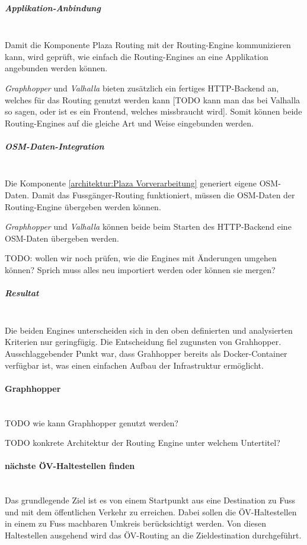 \subparagraph{Applikation-Anbindung}~\\
\label{architektur:Applikation-Anbindung}
Damit die Komponente Plaza Routing mit der Routing-Engine kommunizieren kann, wird geprüft, wie einfach die Routing-Engines an eine Applikation angebunden werden können. 

\emph{Graphhopper} und \emph{Valhalla} bieten zusätzlich ein fertiges HTTP-Backend an, welches für das Routing genutzt werden kann [TODO kann man das bei Valhalla so sagen, oder ist es ein Frontend, welches missbraucht wird]. Somit können beide Routing-Engines auf die gleiche Art und Weise eingebunden werden.

\subparagraph{OSM-Daten-Integration}~\\
\label{architektur:OSM-Daten-Integration}
Die Komponente \ref{architektur:Plaza Vorverarbeitung} generiert eigene \ac{OSM}-Daten. Damit das Fussgänger-Routing funktioniert, müssen die \ac{OSM}-Daten der Routing-Engine übergeben werden können. 

\emph{Graphhopper} und \emph{Valhalla} können beide beim Starten des HTTP-Backend eine {OSM}-Daten übergeben werden.

TODO: wollen wir noch prüfen, wie die Engines mit Änderungen umgehen können? Sprich muss alles neu importiert werden oder können sie mergen?

\subparagraph{Resultat}~\\
\label{architektur:Resulat}
Die beiden Engines unterscheiden sich in den oben definierten und analysierten Kriterien nur geringfügig. Die Entscheidung fiel zugunsten von Grahhopper. Ausschlaggebender Punkt war, dass Grahhopper bereits als Docker-Container verfügbar ist, was einen einfachen Aufbau der Infrastruktur ermöglicht.

\paragraph{Graphhopper}~\\
\label{architektur:Graphhopper}
TODO wie kann Graphhopper genutzt werden?


TODO konkrete Architektur der Routing Engine unter welchem Untertitel?


\paragraph{nächste ÖV-Haltestellen finden}~\\
\label{architektur:nächste ÖV-Haltestellen finden}
Das grundlegende Ziel ist es von einem Startpunkt aus eine Destination zu Fuss und mit dem öffentlichen Verkehr zu erreichen. Dabei sollen die ÖV-Haltestellen in einem zu Fuss machbaren Umkreis berücksichtigt werden. Von diesen Haltestellen ausgehend wird das ÖV-Routing an die Zieldestination durchgeführt.

